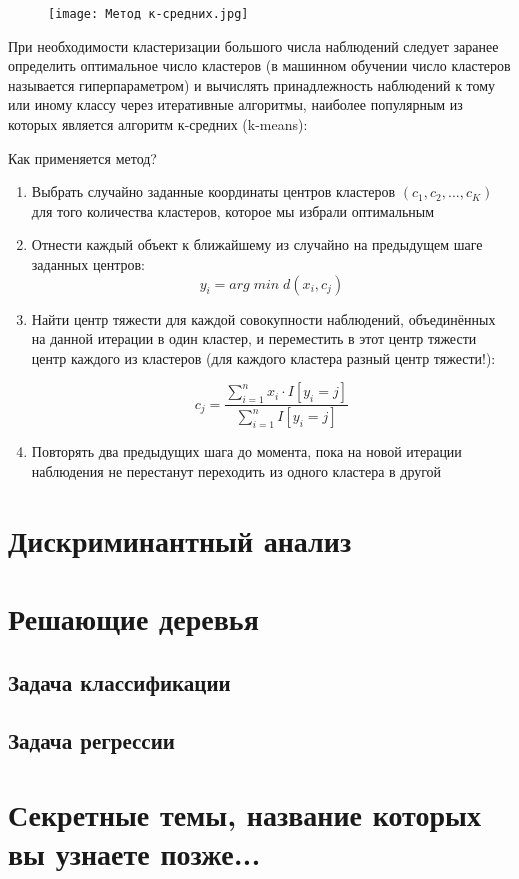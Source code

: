 \documentclass[a4paper,12pt]{article} %
\begin{document}
\begin{figure}[htp]
    \centering
    \texttt{[image: Метод к-средних.jpg]}
\end{figure}

При необходимости кластеризации большого числа наблюдений следует заранее определить оптимальное число кластеров (в машинном обучении число кластеров называется гиперпараметром) и вычислять принадлежность наблюдений к тому или иному классу через итеративные алгоритмы, наиболее популярным из которых является алгоритм к-средних (k-means):

Как применяется метод?
\begin{enumerate}
    \item Выбрать случайно заданные координаты центров кластеров $(c_1, c_2, ..., c_K)$ для того количества кластеров, которое мы избрали оптимальным
    \item Отнести каждый объект к ближайшему из случайно на предыдущем шаге заданных центров:
    \[y_i=arg\; min \; d(x_i, c_j)\]
    
    \item Найти центр тяжести для каждой совокупности наблюдений, объединённых на данной итерации в один кластер, и переместить в этот центр тяжести центр каждого из кластеров (для каждого кластера разный центр тяжести!):
    
    \[c_j = \frac{\sum\limits_{i=1}^n x_i\cdot I[y_i=j]}{\sum\limits_{i=1}^n I[y_i=j]}\]
    
    \item Повторять два предыдущих шага до момента, пока на новой итерации наблюдения не перестанут переходить из одного кластера в другой
\end{enumerate}

\section{Дискриминантный анализ}

\section{Решающие деревья}

\subsection{Задача классификации}

\subsection{Задача регрессии}

\section{Секретные темы, название которых вы узнаете позже...}
\end{document}
